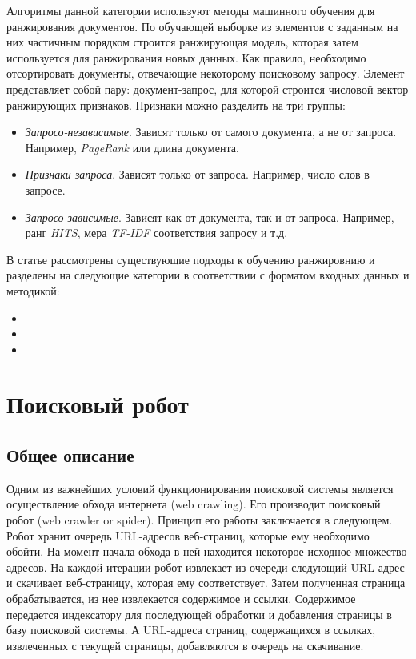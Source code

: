 Алгоритмы данной категории используют методы машинного обучения для ранжирования документов. По обучающей выборке из элементов с заданным на них частичным порядком строится ранжирующая модель, которая затем используется для ранжирования новых данных. Как правило, необходимо отсортировать документы, отвечающие некоторому поисковому запросу. Элемент представляет собой пару: документ-запрос, для которой строится числовой вектор ранжирующих признаков. Признаки можно разделить на три группы:

\begin{itemize}
\item \textit{Запросо-независимые}. Зависят только от самого документа, а не от запроса. Например, \textit{PageRank} или длина документа.
\item \textit{Признаки запроса}. Зависят только от запроса. Например, число слов в запросе.
\item \textit{Запросо-зависимые}. Зависят как от документа, так и от запроса. Например, ранг \textit{HITS}, мера \textit{TF-IDF} соответствия запросу и т.д.
\end{itemize}

В статье \cite{Liu} рассмотрены существующие подходы к обучению ранжировнию и разделены на следующие категории в соответствии с форматом входных данных и методикой:

\begin{itemize}
\item 
\item
\item 
\end{itemize}

\section{Поисковый робот}
\label{spider}

\subsection{Общее описание}

Одним из важнейших условий функционирования поисковой системы является осуществление обхода интернета (web crawling). Его производит поисковый робот (web crawler or spider). Принцип его работы заключается в следующем. Робот хранит очередь URL-адресов веб-страниц, которые ему необходимо обойти. На момент начала обхода в ней находится некоторое исходное множество адресов. На каждой итерации робот извлекает из очереди следующий URL-адрес и скачивает веб-страницу, которая ему соответствует. Затем полученная страница обрабатывается, из нее извлекается содержимое и ссылки. Содержимое передается индексатору для последующей обработки и добавления страницы в базу поисковой системы. А URL-адреса страниц, содержащихся в ссылках, извлеченных с текущей страницы, добавляются в очередь на скачивание.

